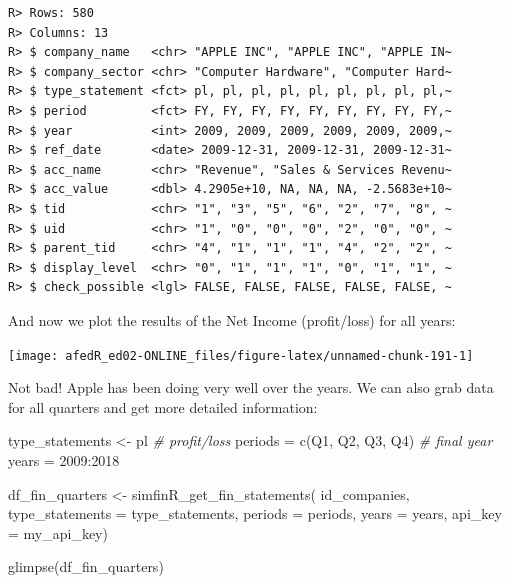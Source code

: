 \documentclass[
  12pt,
]{book}
\newenvironment{Shaded}{\begin{snugshade}}{\end{snugshade}}
\newcommand{\AttributeTok}[1]{\textcolor[rgb]{0.61,0.61,0.61}{#1}}
\newcommand{\CommentTok}[1]{\textcolor[rgb]{0.37,0.37,0.37}{\textit{#1}}}
\newcommand{\DecValTok}[1]{\textcolor[rgb]{0.06,0.06,0.06}{#1}}
\newcommand{\FunctionTok}[1]{\textcolor[rgb]{0,0,0}{#1}}
\newcommand{\NormalTok}[1]{#1}
\newcommand{\OtherTok}[1]{\textcolor[rgb]{0.37,0.37,0.37}{#1}}
\newcommand{\SpecialCharTok}[1]{\textcolor[rgb]{0,0,0}{#1}}
\newcommand{\StringTok}[1]{\textcolor[rgb]{0.5,0.5,0.5}{#1}}
\begin{document}
\begin{verbatim}
R> Rows: 580
R> Columns: 13
R> $ company_name   <chr> "APPLE INC", "APPLE INC", "APPLE IN~
R> $ company_sector <chr> "Computer Hardware", "Computer Hard~
R> $ type_statement <fct> pl, pl, pl, pl, pl, pl, pl, pl, pl,~
R> $ period         <fct> FY, FY, FY, FY, FY, FY, FY, FY, FY,~
R> $ year           <int> 2009, 2009, 2009, 2009, 2009, 2009,~
R> $ ref_date       <date> 2009-12-31, 2009-12-31, 2009-12-31~
R> $ acc_name       <chr> "Revenue", "Sales & Services Revenu~
R> $ acc_value      <dbl> 4.2905e+10, NA, NA, NA, -2.5683e+10~
R> $ tid            <chr> "1", "3", "5", "6", "2", "7", "8", ~
R> $ uid            <chr> "1", "0", "0", "0", "2", "0", "0", ~
R> $ parent_tid     <chr> "4", "1", "1", "1", "4", "2", "2", ~
R> $ display_level  <chr> "0", "1", "1", "1", "0", "1", "1", ~
R> $ check_possible <lgl> FALSE, FALSE, FALSE, FALSE, FALSE, ~
\end{verbatim}

And now we plot the results of the Net Income (profit/loss) for all years:

\begin{center}\texttt{[image: afedR\_ed02-ONLINE\_files/figure-latex/unnamed-chunk-191-1]} \end{center}

Not bad! Apple has been doing very well over the years. We can also grab data for all quarters and get more detailed information:

\begin{Shaded}
\begin{Highlighting}[]
\NormalTok{type\_statements }\OtherTok{\textless{}{-}} \StringTok{\textquotesingle{}pl\textquotesingle{}} \CommentTok{\# profit/loss}
\NormalTok{periods }\OtherTok{=} \FunctionTok{c}\NormalTok{(}\StringTok{\textquotesingle{}Q1\textquotesingle{}}\NormalTok{, }\StringTok{\textquotesingle{}Q2\textquotesingle{}}\NormalTok{, }\StringTok{\textquotesingle{}Q3\textquotesingle{}}\NormalTok{, }\StringTok{\textquotesingle{}Q4\textquotesingle{}}\NormalTok{) }\CommentTok{\# final year}
\NormalTok{years }\OtherTok{=} \DecValTok{2009}\SpecialCharTok{:}\DecValTok{2018}

\NormalTok{df\_fin\_quarters }\OtherTok{\textless{}{-}} \FunctionTok{simfinR\_get\_fin\_statements}\NormalTok{(}
\NormalTok{  id\_companies,}
  \AttributeTok{type\_statements =}\NormalTok{ type\_statements,}
  \AttributeTok{periods =}\NormalTok{ periods,}
  \AttributeTok{years =}\NormalTok{ years,}
  \AttributeTok{api\_key =}\NormalTok{ my\_api\_key)}

\FunctionTok{glimpse}\NormalTok{(df\_fin\_quarters)}
\end{Highlighting}
\end{Shaded}
\end{document}
